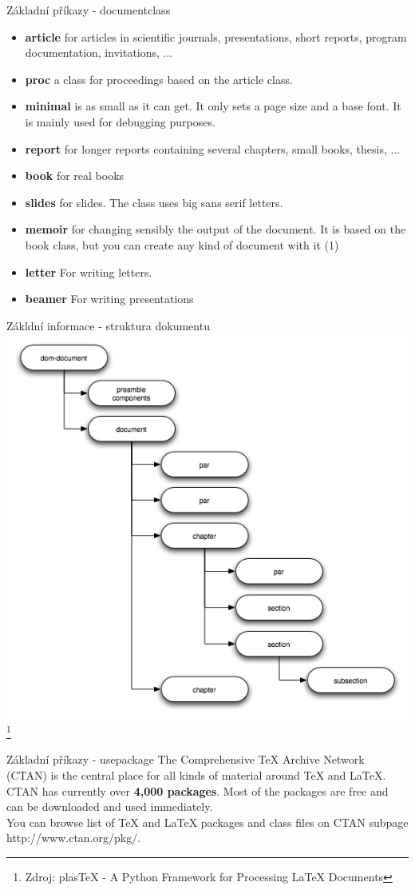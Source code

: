 \documentclass{beamer}
\begin{document}
\begin{frame}{Základní příkazy - documentclass}
\begin{itemize}
    \item \textbf{article} for articles in scientific journals, presentations, short reports, program documentation, invitations, ...
    \item \textbf{proc} a class for proceedings based on the article class.
    \item \textbf{minimal} is as small as it can get. It only sets a page size and a base font. It is mainly used for debugging purposes.
    \item \textbf{report} for longer reports containing several chapters, small books, thesis, ...
    \item \textbf{book} for real books
    \item \textbf{slides} for slides. The class uses big sans serif letters.
    \item \textbf{memoir} for changing sensibly the output of the document. It is based on the book class, but you can create any kind of document with it (1)
    \item \textbf{letter} For writing letters.
    \item \textbf{beamer} For writing presentations
\end{itemize}
\end{frame}

\begin{frame}{Zákldní informace - struktura dokumentu}
\includegraphics[width=.7\textwidth]{pic/docstruct.png}
\footnote{Zdroj: plasTeX - A Python Framework for Processing LaTeX Documents}
\end{frame}{}
\begin{frame}{Základní příkazy - usepackage}
    The Com­pre­hen­sive TeX Archive Net­work (CTAN) is the cen­tral place for all kinds of ma­te­rial around TeX and LaTeX. CTAN has cur­rently over \textbf{4,000 pack­ages}. Most of the pack­ages are free and can be down­loaded and used im­me­di­ately. \\
    \vspace{1cm}
    You can browse list of TeX and LaTeX packages and class files on CTAN subpage http://www.ctan.org/pkg/. 
\end{frame}
\end{document}

